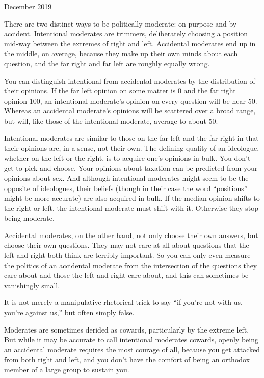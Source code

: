 December 2019

There are two distinct ways to be politically moderate: on purpose and
by accident. Intentional moderates are trimmers, deliberately choosing a
position mid-way between the extremes of right and left. Accidental
moderates end up in the middle, on average, because they make up their
own minds about each question, and the far right and far left are
roughly equally wrong.

You can distinguish intentional from accidental moderates by the
distribution of their opinions. If the far left opinion on some matter
is 0 and the far right opinion 100, an intentional moderate's opinion on
every question will be near 50. Whereas an accidental moderate's
opinions will be scattered over a broad range, but will, like those of
the intentional moderate, average to about 50.

Intentional moderates are similar to those on the far left and the far
right in that their opinions are, in a sense, not their own. The
defining quality of an ideologue, whether on the left or the right, is
to acquire one's opinions in bulk. You don't get to pick and choose.
Your opinions about taxation can be predicted from your opinions about
sex. And although intentional moderates might seem to be the opposite of
ideologues, their beliefs (though in their case the word ``positions''
might be more accurate) are also acquired in bulk. If the median opinion
shifts to the right or left, the intentional moderate must shift with
it. Otherwise they stop being moderate.

Accidental moderates, on the other hand, not only choose their own
answers, but choose their own questions. They may not care at all about
questions that the left and right both think are terribly important. So
you can only even measure the politics of an accidental moderate from
the intersection of the questions they care about and those the left and
right care about, and this can sometimes be vanishingly small.

It is not merely a manipulative rhetorical trick to say ``if you're not
with us, you're against us,'' but often simply false.

Moderates are sometimes derided as cowards, particularly by the extreme
left. But while it may be accurate to call intentional moderates
cowards, openly being an accidental moderate requires the most courage
of all, because you get attacked from both right and left, and you don't
have the comfort of being an orthodox member of a large group to sustain
you.

